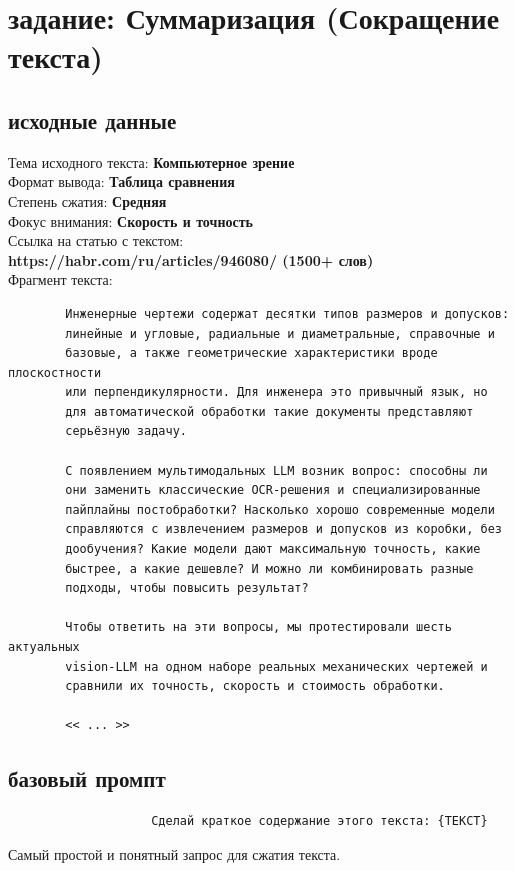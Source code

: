 \section{задание: Суммаризация (Сокращение текста)}
\subsection{исходные данные}
\indent Тема исходного текста: \textbf{Компьютерное зрение} \\
\indent Формат вывода: \textbf{Таблица сравнения} \\
\indent Степень сжатия: \textbf{Средняя} \\
\indent Фокус внимания: \textbf{Скорость и точность} \\
\indent Ссылка на статью с текстом: \textbf{ \\ \indent \indent https://habr.com/ru/articles/946080/ (1500+ слов)} \\
\newpage
\noindent Фрагмент текста:
\begin{verbatim}
		Инженерные чертежи содержат десятки типов размеров и допусков:
		линейные и угловые, радиальные и диаметральные, справочные и
		базовые, а также геометрические характеристики вроде плоскостности
		или перпендикулярности. Для инженера это привычный язык, но
		для автоматической обработки такие документы представляют
		серьёзную задачу.

		С появлением мультимодальных LLM возник вопрос: способны ли
		они заменить классические OCR-решения и специализированные
		пайплайны постобработки? Насколько хорошо современные модели
		справляются с извлечением размеров и допусков из коробки, без
		дообучения? Какие модели дают максимальную точность, какие
		быстрее, а какие дешевле? И можно ли комбинировать разные
		подходы, чтобы повысить результат?

		Чтобы ответить на эти вопросы, мы протестировали шесть актуальных
		vision-LLM на одном наборе реальных механических чертежей и
		сравнили их точность, скорость и стоимость обработки.

		<< ... >>
\end{verbatim}
\newpage
\subsection{базовый промпт}
\begin{verbatim}
					Сделай краткое содержание этого текста: {ТЕКСТ}
\end{verbatim}
\noindent Самый простой и понятный запрос для сжатия текста.
